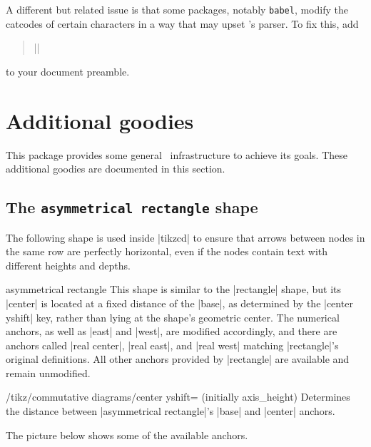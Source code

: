 \documentclass[a4paper]{ltxdoc}
\begin{document}
A different but related issue is that some packages, notably
\texttt{babel}, modify the catcodes of certain characters in a way
that may upset \tikzname's parser.  To fix this, add
\begin{verse}
  |\usetikzlibrary{babel}|
\end{verse}
to your document preamble.

\section{Additional goodies}
\label{sec:general-infra}

This package provides some general \pgfname\ infrastructure to achieve
its goals.  These additional goodies are documented in this section.

\subsection{The \texttt{asymmetrical rectangle} shape}
\label{sec:asymm-rect-shape}

The following shape is used inside |{tikzcd}| to ensure that arrows
between nodes in the same row are perfectly horizontal, even if the
nodes contain text with different heights and depths.

\begin{shape}{asymmetrical rectangle}
  This shape is similar to the |rectangle| shape, but its |center| is
  located at a fixed distance of the |base|, as determined by the
  |center yshift| key, rather than lying at the shape's geometric
  center.  The numerical anchors, as well as |east| and |west|, are
  modified accordingly, and there are anchors called |real center|,
  |real east|, and |real west| matching |rectangle|'s original
  definitions.  All other anchors provided by |rectangle| are
  available and remain unmodified.
\end{shape}

\begin{key}{/tikz/commutative diagrams/center yshift=
    (initially axis\_height)}
  Determines the distance between |asymmetrical rectangle|'s |base|
  and |center| anchors.
\end{key}

The picture below shows some of the available anchors.

\begin{center}\Huge
\end{center}
\end{document}
